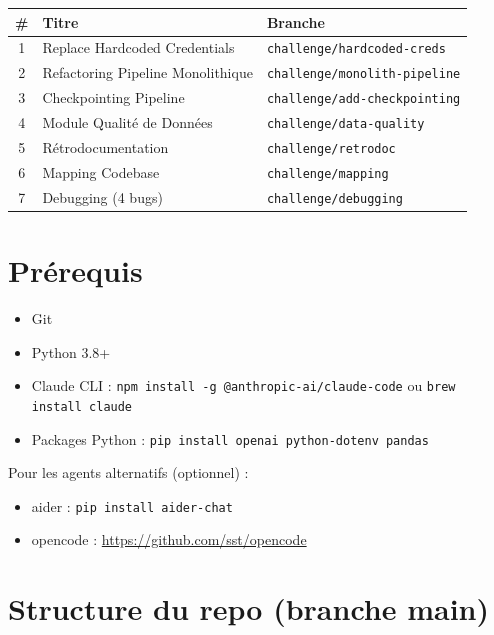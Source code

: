 \documentclass[11pt,a4paper]{article}
\newcommand{\code}[1]{\texttt{#1}}
\begin{document}
\begin{center}
\begin{tabular}{cll}
  \toprule
  \# & Titre & Branche \\
  \midrule
  1 & Replace Hardcoded Credentials     & \code{challenge/hardcoded-creds} \\
  2 & Refactoring Pipeline Monolithique & \code{challenge/monolith-pipeline} \\
  3 & Checkpointing Pipeline            & \code{challenge/add-checkpointing} \\
  4 & Module Qualité de Données         & \code{challenge/data-quality} \\
  5 & Rétrodocumentation                & \code{challenge/retrodoc} \\
  6 & Mapping Codebase                  & \code{challenge/mapping} \\
  7 & Debugging (4 bugs)                & \code{challenge/debugging} \\
  \bottomrule
\end{tabular}
\end{center}

\section{Prérequis}

\begin{itemize}
  \item Git
  \item Python 3.8+
  \item Claude CLI : \code{npm install -g @anthropic-ai/claude-code} ou \code{brew install claude}
  \item Packages Python : \code{pip install openai python-dotenv pandas}
\end{itemize}

Pour les agents alternatifs (optionnel) :
\begin{itemize}
  \item aider : \code{pip install aider-chat}
  \item opencode : \url{https://github.com/sst/opencode}
\end{itemize}

\section{Structure du repo (branche main)}
\end{document}
